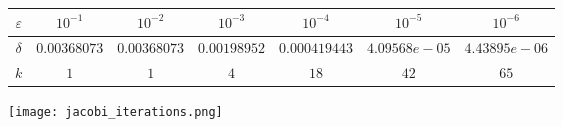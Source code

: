 \begin{tabular}{|c|cccccc|}
\hline
$\varepsilon$&$10^{-1}$&$10^{-2}$&$10^{-3}$&$10^{-4}$&$10^{-5}$&$10^{-6}$\\
\hline
$\delta$&$0.00368073
$&$0.00368073
$&$0.00198952
$&$0.000419443
$&$4.09568e-05
$&$4.43895e-06
$\\
\hline
$k$&$1
$&$1
$&$4
$&$18
$&$42
$&$65
$\\
\hline
\end{tabular}

\texttt{[image: jacobi\_iterations.png]}